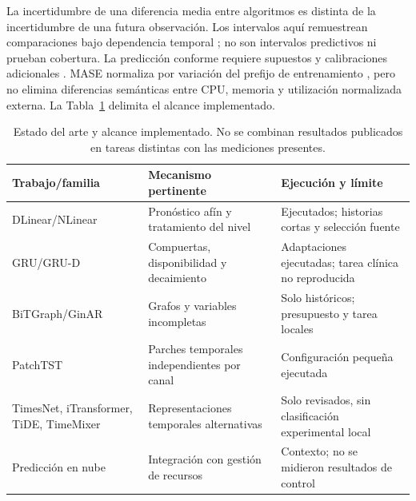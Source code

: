 La incertidumbre de una diferencia media entre algoritmos es distinta de la incertidumbre de una futura observación. Los intervalos aquí remuestrean comparaciones bajo dependencia temporal \cite{blockbootstrap}; no son intervalos predictivos ni prueban cobertura. La predicción conforme requiere supuestos y calibraciones adicionales \cite{conformal}. MASE normaliza por variación del prefijo de entrenamiento \cite{mase}, pero no elimina diferencias semánticas entre CPU, memoria y utilización normalizada externa. La Tabla~\ref{tab:related} delimita el alcance implementado.
\begin{table}[!t]
\caption{Estado del arte y alcance implementado. No se combinan resultados publicados en tareas distintas con las mediciones presentes.}\label{tab:related}
\centering\footnotesize
\begin{tabularx}{\linewidth}{p{.22\linewidth}XX}
\toprule Trabajo/familia & Mecanismo pertinente & Ejecución y límite \\\midrule
DLinear/NLinear \cite{dlinear} & Pronóstico afín y tratamiento del nivel & Ejecutados; historias cortas y selección fuente \\
GRU/GRU-D \cite{gru,grud} & Compuertas, disponibilidad y decaimiento & Adaptaciones ejecutadas; tarea clínica no reproducida \\
BiTGraph/GinAR \cite{bitgraph,ginar} & Grafos y variables incompletas & Solo históricos; presupuesto y tarea locales \\
PatchTST \cite{patchtst} & Parches temporales independientes por canal & Configuración pequeña ejecutada \\
TimesNet, iTransformer, TiDE, TimeMixer \cite{timesnet,itransformer,tide,timemixer} & Representaciones temporales alternativas & Solo revisados, sin clasificación experimental local \\
Predicción en nube \cite{powerprediction,temposcale,aero,stamp} & Integración con gestión de recursos & Contexto; no se midieron resultados de control \\
\bottomrule\end{tabularx}
\end{table}
